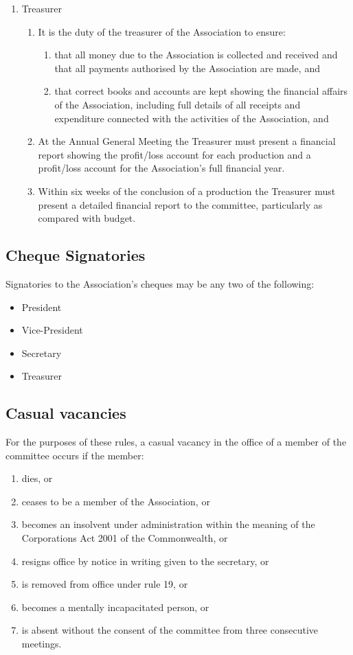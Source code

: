 \begin{enumerate}
\begin{enumerate}
    \end{enumerate}
  \item Treasurer
    \begin{enumerate}
      \item It is the duty of the treasurer of the Association to ensure:
        \begin{enumerate}
          \item that all money due to the Association is collected and received and that all payments authorised by the Association are made, and
          \item that correct books and accounts are kept showing the financial affairs of the Association, including full details of all receipts and expenditure connected with the activities of the Association, and
        \end{enumerate}
      \item At the Annual General Meeting the Treasurer must present a financial report showing the profit/loss account for each production and a profit/loss account for the Association’s full financial year.
      \item Within six weeks of the conclusion of a production the Treasurer must present a detailed financial report to the committee, particularly as compared with budget.
    \end{enumerate}
\end{enumerate}
\subsection{Cheque Signatories}
Signatories to the Association’s cheques may be any two of the following:
\begin{itemize}
  \item President
  \item Vice-President
  \item Secretary
  \item Treasurer
\end{itemize}
\subsection{Casual vacancies}
For the purposes of these rules, a casual vacancy in the office of a member of the committee occurs if the member:
\begin{enumerate}
  \item dies, or
  \item ceases to be a member of the Association, or
  \item becomes an insolvent under administration within the meaning of the Corporations Act 2001 of the Commonwealth, or
  \item resigns office by notice in writing given to the secretary, or
  \item is removed from office under rule 19, or
  \item becomes a mentally incapacitated person, or
  \item is absent without the consent of the committee from three consecutive meetings.
\end{enumerate}
